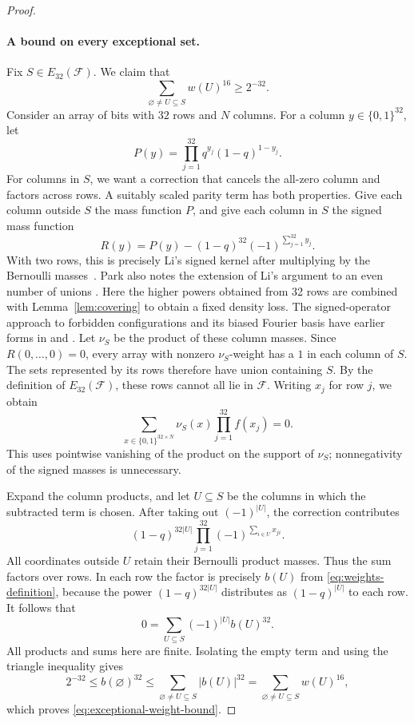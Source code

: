\begin{proof}
\paragraph{A bound on every exceptional set.}
Fix $S\in E_{32}(\mathcal F)$. We claim that
\begin{equation}\label{eq:exceptional-weight-bound}
 \sum_{\varnothing\ne U\subseteq S}w(U)^{16}\ge2^{-32}.
\end{equation}
Consider an array of bits with $32$ rows and $N$ columns. For a column
$y\in\{0,1\}^{32}$, let
\[
 P(y)=\prod_{j=1}^{32}q^{y_j}(1-q)^{1-y_j}.
\]
For columns in $S$, we want a correction that cancels the all-zero column
and factors across rows. A suitably scaled parity term has both properties.
Give each column outside $S$ the mass function $P$, and give each column
in $S$ the signed mass function
\[
 R(y)=P(y)-(1-q)^{32}(-1)^{\sum_{j=1}^{32}y_j}.
\]
With two rows, this is precisely Li's signed kernel after multiplying
by the Bernoulli masses~\cite[Section~2]{Li26}. Park also notes the
extension of Li's argument to an even number of unions
\cite[Corollary~3.5, footnote~3]{Park26}. Here the higher powers obtained
from 32 rows are combined with Lemma~\ref{lem:covering} to obtain a
fixed density loss.
The signed-operator approach to forbidden configurations and its biased
Fourier basis have earlier forms in
\cite[Section~2.2]{Friedgut08} and
\cite[Section~4.1]{EllisFilmusFriedgut12}.
Let $\nu_S$ be the product of these column masses. Since
$R(0,\ldots,0)=0$, every array with nonzero $\nu_S$-weight has a $1$
in each column of $S$. The sets represented by its rows therefore have
union containing $S$. By the definition of $E_{32}(\mathcal F)$, these
rows cannot all lie in $\mathcal F$. Writing $x_j$ for row $j$, we obtain
\[
 \sum_{x\in\{0,1\}^{32\times N}}\nu_S(x)
 \prod_{j=1}^{32}f(x_j)=0.
\]
This uses pointwise vanishing of the product on the support of $\nu_S$;
nonnegativity of the signed masses is unnecessary.

Expand the column products, and let $U\subseteq S$ be the columns in
which the subtracted term is chosen. After taking out $(-1)^{|U|}$,
the correction contributes
\[
 (1-q)^{32|U|}\prod_{j=1}^{32}
 (-1)^{\sum_{i\in U}x_{ji}}.
\]
All coordinates outside $U$ retain their Bernoulli product masses.
Thus the sum factors over rows. In each row the factor is precisely
$b(U)$ from \eqref{eq:weights-definition}, because the power
$(1-q)^{32|U|}$ distributes as $(1-q)^{|U|}$ to each row.
It follows that
\begin{equation}\label{eq:signed-identity}
 0=\sum_{U\subseteq S}(-1)^{|U|}b(U)^{32}.
\end{equation}
All products and sums here are finite. Isolating the empty term and
using the triangle inequality gives
\[
 2^{-32}\le b(\varnothing)^{32}
 \le\sum_{\varnothing\ne U\subseteq S}|b(U)|^{32}
 =\sum_{\varnothing\ne U\subseteq S}w(U)^{16},
\]
which proves \eqref{eq:exceptional-weight-bound}.


\end{proof}
